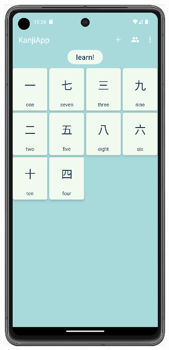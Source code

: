 \documentclass[a4paper,twoside,12pt]{book}
\begin{document}
\begin{figure}
\centering
\begin{subfigure}{0.3\textwidth}
    \includegraphics[width=\textwidth]{learn/list}

\end{subfigure}
\end{figure}
\end{document}
